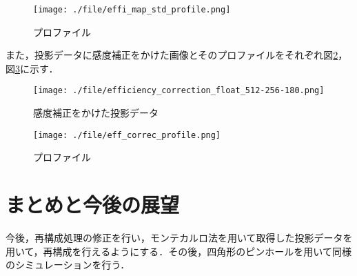 \documentclass[dvipdfmx,autodetect-engine,twocolumn,10pt]{jsarticle}%
\begin{document}
\begin{figure}[htbp]
  \begin{center}
    \texttt{[image: ./file/effi\_map\_std\_profile.png]}\\
    \caption{プロファイル}
    \label{effi_map_std_profile}
  \end{center}
\end{figure}
\newpage
また，投影データに感度補正をかけた画像とそのプロファイルをそれぞれ図\ref{eff_correc}，図\ref{eff_correc_profile}に示す．

\begin{figure}[htbp]
  \begin{center}
    \texttt{[image: ./file/efficiency\_correction\_float\_512-256-180.png]}\\
    \caption{感度補正をかけた投影データ}
    \label{eff_correc}
  \end{center}
\end{figure}

\begin{figure}[htbp]
  \begin{center}
    \texttt{[image: ./file/eff\_correc\_profile.png]}\\
    \caption{プロファイル}
    \label{eff_correc_profile}
  \end{center}
\end{figure}

\newpage



\section{まとめと今後の展望}
今後，再構成処理の修正を行い，モンテカルロ法を用いて取得した投影データを用いて，再構成を行えるようにする．その後，四角形のピンホールを用いて同様のシミュレーションを行う．
\end{document}
